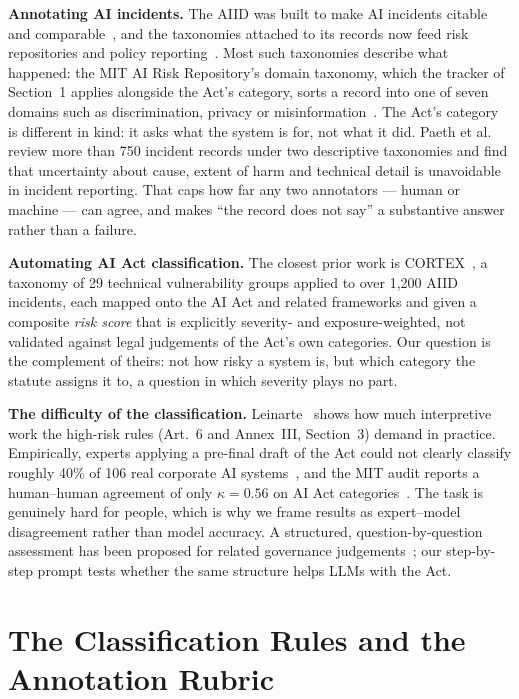\documentclass[sigconf,natbib=false, language=english]{acmart}
\begin{document}
\textbf{Annotating AI incidents.} The AIID was built to make AI incidents citable
and comparable~\cite{mcgregor2021}, and the taxonomies attached to its records now
feed risk repositories and policy reporting~\cite{slattery2026}. Most such taxonomies
describe what happened: the MIT AI Risk Repository's domain taxonomy, which the
tracker of Section~1 applies alongside the Act's category, sorts a record into one of
seven domains such as discrimination, privacy or misinformation~\cite{slattery2026}.
The Act's category is different in kind: it asks what the system is for, not what it
did. Paeth et al.~\cite{paeth2025} review more than 750 incident records under two
descriptive taxonomies and find that uncertainty about cause, extent of harm and
technical detail is unavoidable in incident reporting. That caps how far any two
annotators --- human or machine --- can agree, and makes ``the record does not say''
a substantive answer rather than a failure.

\textbf{Automating AI Act classification.} The closest prior work is
CORTEX~\cite{cortex2025}, a taxonomy of 29 technical vulnerability groups applied to
over 1,200 AIID incidents, each mapped onto the AI Act and related frameworks and
given a composite \emph{risk score} that is explicitly severity- and
exposure-weighted, not validated against legal judgements of the Act's own
categories. Our question is the complement of theirs: not how risky a system is, but
which category the statute assigns it to, a question in which severity plays no part.

\textbf{The difficulty of the classification.} Leinarte~\cite{leinarte2024} shows how
much interpretive work the high-risk rules (Art.~6 and Annex~III, Section~3) demand
in practice. Empirically, experts applying a pre-final draft of the Act could not
clearly classify roughly 40\% of 106 real corporate AI systems~\cite{appliedai}, and
the MIT audit reports a human--human agreement of only $\kappa = 0.56$ on AI Act
categories~\cite{mit_tracker_2026}. The task is genuinely hard for people, which is
why we frame results as expert--model disagreement rather than model accuracy. A
structured, question-by-question assessment has been proposed for related governance
judgements~\cite{constantinides2024}; our step-by-step prompt tests whether the same
structure helps LLMs with the Act.

\section{The Classification Rules and the Annotation Rubric}
\end{document}
